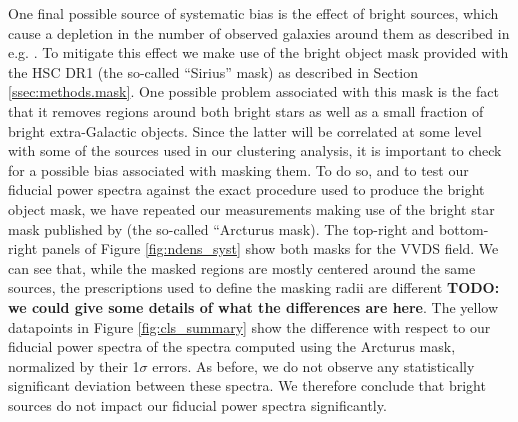\documentclass[a4paper,11pt]{article}
\newcommand{\todo}[1]{{\bf TODO: #1}}
\begin{document}
      One final possible source of systematic bias is the effect of bright sources, which cause a depletion in the number of observed galaxies around them as described in e.g. \cite{2018PASJ...70S...7C}. To mitigate this effect we make use of the bright object mask provided with the HSC DR1 (the so-called ``Sirius'' mask) as described in Section \ref{ssec:methods.mask}. One possible problem associated with this mask is the fact that it removes regions around both bright stars as well as a small fraction of bright extra-Galactic objects. Since the latter will be correlated at some level with some of the sources used in our clustering analysis, it is important to check for a possible bias associated with masking them. To do so, and to test our fiducial power spectra against the exact procedure used to produce the bright object mask, we have repeated our measurements making use of the bright star mask published by \cite{2018PASJ...70S...7C} (the so-called ``Arcturus mask). The top-right and bottom-right panels of Figure \ref{fig:ndens_syst} show both masks for the VVDS field. We can see that, while the masked regions are mostly centered around the same sources, the prescriptions used to define the masking radii are different \todo{we could give some details of what the differences are here}. The yellow datapoints in Figure \ref{fig:cls_summary} show the difference with respect to our fiducial power spectra of the spectra computed using the Arcturus mask, normalized by their 1$\sigma$ errors. As before, we do not observe any statistically significant deviation between these spectra. We therefore conclude that bright sources do not impact our fiducial power spectra significantly. 
      
\end{document}
